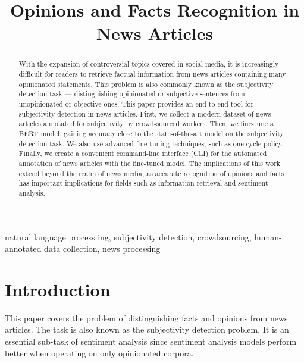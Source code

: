 \documentclass[conference]{IEEEtran}
\begin{document}
\title{Opinions and Facts Recognition in News Articles}

\author{
}

\maketitle

\begin{abstract}
With the expansion of controversial topics covered in social media, it is increasingly difficult for readers to retrieve factual information from news articles containing many opinionated statements. This problem is also commonly known as the subjectivity detection task --- distinguishing opinionated or subjective sentences from unopinionated or objective ones. This paper provides an end-to-end tool for subjectivity detection in news articles. First, we collect a modern dataset of news articles annotated for subjectivity by crowd-sourced workers. Then, we fine-tune a BERT model, gaining accuracy close to the state-of-the-art model on the subjectivity detection task. We also use advanced fine-tuning techniques, such as one cycle policy. Finally, we create a convenient command-line interface (CLI) for the automated annotation of news articles with the fine-tuned model. The implications of this work extend beyond the realm of news media, as accurate recognition of opinions and facts has important implications for fields such as information retrieval and sentiment analysis.
\end{abstract}

\begin{IEEEkeywords}
natural language process ing, subjectivity detection, crowdsourcing, human-annotated data collection, news processing
\end{IEEEkeywords}

\section{Introduction}
This paper covers the problem of distinguishing facts and opinions from news articles. The task is also known as the subjectivity detection problem. It is an essential sub-task of sentiment analysis since sentiment analysis models perform better when operating on only opinionated corpora.
\end{document}
